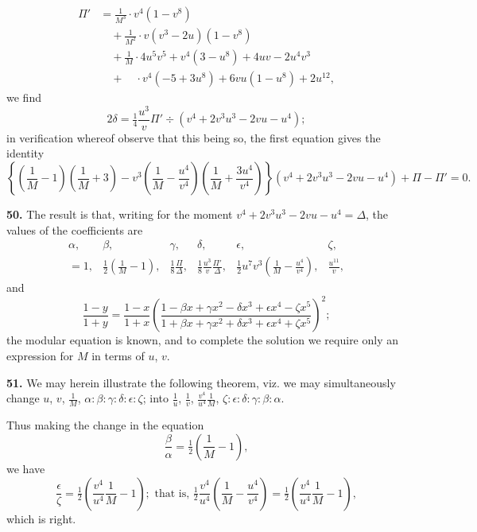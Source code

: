 \documentclass[12pt,a4paper]{article}
\begin{document}
\begin{align*}
\Pi' &= \frac{1}{M^3} \cdot v^4(1 - v^8) \\
&\quad + \frac{1}{M^2} \cdot v(v^3 - 2u)(1 - v^8) \\
&\quad + \frac{1}{M} \cdot 4u^5 v^5 + v^4(3 - u^8) + 4uv - 2u^4 v^3 \\
&\quad + \quad \cdot v^4(-5 + 3u^8) + 6vu(1 - u^8) + 2u^{12},
\end{align*}
we find
\[
2\delta = \tfrac{1}{4}\frac{u^3}{v}\Pi' \div (v^4 + 2v^3 u^3 - 2vu - u^4);
\]
in verification whereof observe that this being so, the first equation gives the identity
\[
\left\{\left(\frac{1}{M} - 1\right)\left(\frac{1}{M} + 3\right)
- v^3\left(\frac{1}{M} - \frac{u^4}{v^4}\right)\left(\frac{1}{M} + \frac{3u^4}{v^4}\right)\right\}
(v^4 + 2v^3 u^3 - 2vu - u^4) + \Pi - \Pi' = 0.
\]

\textbf{50.} The result is that, writing for the moment $v^4 + 2v^3 u^3 - 2vu - u^4 = \Delta$, the values of the coefficients are
\[
\begin{array}{cccccc}
\alpha, & \beta, & \gamma, & \delta, & \epsilon, & \zeta, \\
= 1, & \frac{1}{2}\left(\frac{1}{M} - 1\right), & \frac{1}{8}\frac{\Pi}{\Delta}, &
\frac{1}{8}\frac{u^3}{v}\frac{\Pi'}{\Delta}, &
\frac{1}{2}u^7 v^3\left(\frac{1}{M} - \frac{u^4}{v^4}\right), & \frac{u^{11}}{v},
\end{array}
\]
and
\[
\frac{1 - y}{1 + y} = \frac{1 - x}{1 + x}
\left(\frac{1 - \beta x + \gamma x^2 - \delta x^3 + \epsilon x^4 - \zeta x^5}
{1 + \beta x + \gamma x^2 + \delta x^3 + \epsilon x^4 + \zeta x^5}\right)^2;
\]
the modular equation is known, and to complete the solution we require only an expression for $M$ in terms of $u$, $v$.

\textbf{51.} We may herein illustrate the following theorem, viz. we may simultaneously change $u$, $v$, $\frac{1}{M}$, $\alpha : \beta : \gamma : \delta : \epsilon : \zeta$; into $\frac{1}{u}$, $\frac{1}{v}$, $\frac{v^4}{u^4}\frac{1}{M}$, $\zeta : \epsilon : \delta : \gamma : \beta : \alpha$.

Thus making the change in the equation
\[
\frac{\beta}{\alpha} = \tfrac{1}{2}\left(\frac{1}{M} - 1\right),
\]
we have
\[
\frac{\epsilon}{\zeta} = \tfrac{1}{2}\left(\frac{v^4}{u^4}\frac{1}{M} - 1\right);
\text{ that is, } \tfrac{1}{2}\frac{v^4}{u^4}\left(\frac{1}{M} - \frac{u^4}{v^4}\right)
= \tfrac{1}{2}\left(\frac{v^4}{u^4}\frac{1}{M} - 1\right),
\]
which is right.
\end{document}
